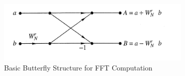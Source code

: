 \begin{figure}[!h]
\centering
\includegraphics[scale=0.75]{figures/butterfly.png}
\caption{Basic Butterfly Structure for FFT Computation}
\label{fig:butterfly}
\end{figure}
